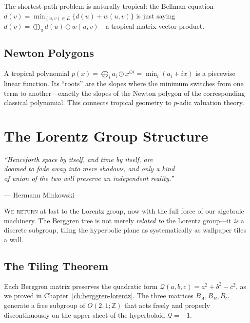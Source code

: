 \documentclass[11pt,twoside,openright]{book}
\theoremstyle{definition}
\newcommand{\Z}{\mathbb{Z}}
\newcommand{\lorentzQ}{\mathcal{Q}}
\begin{document}
The shortest-path problem is naturally tropical: the Bellman equation
$d(v) = \min_{(u,v) \in E} \{d(u) + w(u,v)\}$
is just saying $d(v) = \bigoplus_{u} d(u) \odot w(u,v)$---a tropical
matrix-vector product.

\section{Newton Polygons}

A tropical polynomial $p(x) = \bigoplus_i a_i \odot x^{\odot i} = \min_i(a_i + ix)$
is a piecewise linear function. Its ``roots'' are the slopes where the
minimum switches from one term to another---exactly the slopes of the
Newton polygon of the corresponding classical polynomial. This connects
tropical geometry to $p$-adic valuation theory.

\chapter{The Lorentz Group Structure}
\label{ch:lorentz}

\epigraph{\itshape ``Henceforth space by itself, and time by itself, are\\
doomed to fade away into mere shadows, and only a kind\\
of union of the two will preserve an independent reality.''}
{--- Hermann Minkowski}

\lettrine[lines=3]{W}{e return} at last to the Lorentz group, now with the
full force of our algebraic machinery. The Berggren tree is not merely
\emph{related to} the Lorentz group---it \emph{is} a discrete subgroup,
tiling the hyperbolic plane as systematically as wallpaper tiles a wall.

\section{The Tiling Theorem}

Each Berggren matrix preserves the quadratic form
$\lorentzQ(a,b,c) = a^2 + b^2 - c^2$, as we proved in
Chapter~\ref{ch:berggren-lorentz}. The three matrices $B_A, B_B, B_C$
generate a free subgroup of $O(2,1;\Z)$ that acts freely and properly
discontinuously on the upper sheet of the hyperboloid $\lorentzQ = -1$.
\end{document}
